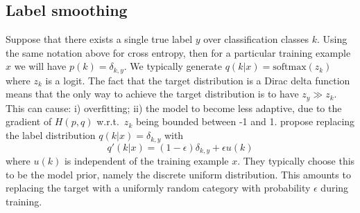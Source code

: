 \documentclass[11pt]{article}
\numberwithin{equation}{section}
\begin{document}
\subsection{Label smoothing}
Suppose that there exists a single true label $y$ over classification classes $k$. Using the same notation above for cross entropy, then for a particular training example $x$ we will have $p(k)=\delta_{k,y}$. We typically generate $q(k|x)= \text{softmax}(z_k)$ where $z_k$ is a logit. The fact that the target distribution is a Dirac delta function means that the only way to achieve the target distribution is to have $z_y \gg z_k$. This can cause: i) overfitting; ii) the model to become less adaptive, due to the gradient of $H(p,q)$ w.r.t.\ $z_k$ being bounded between -1 and 1. \cite{Szegedy16} propose replacing the label distribution $q(k|x)=\delta_{k,y}$ with
\begin{equation}
q'(k|x) = (1-\epsilon) \delta_{k,y} + \epsilon u(k)
\end{equation}
where $u(k)$ is independent of the training example $x$. They typically choose this to be the model prior, namely the discrete uniform distribution. This amounts to replacing the target with a uniformly random category with probability $\epsilon$ during training. 


\newpage
 
\end{document}
